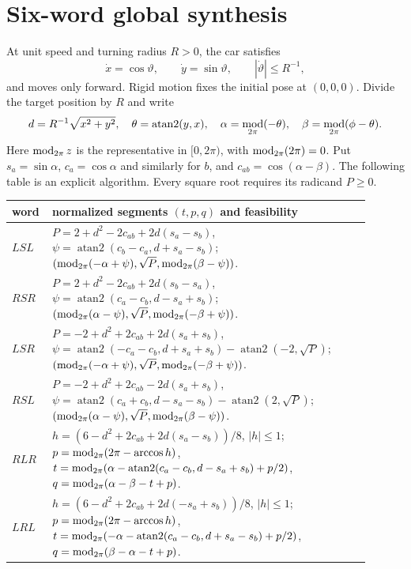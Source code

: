 \documentclass[10pt]{article}
\newcommand{\M}{\mathop{\rm mod}_{2\pi}}
\begin{document}
\section{Six-word global synthesis}
At unit speed and turning radius $R>0$, the car satisfies
\begin{equation}\label{eq:car}
 \dot x=\cos\vartheta,\qquad \dot y=\sin\vartheta,
 \qquad |\dot\vartheta|\le R^{-1},
\end{equation}
and moves only forward.  Rigid motion fixes the initial pose at $(0,0,0)$.
Divide the target position by $R$ and write
\[
 d=R^{-1}\sqrt{x^2+y^2},\quad \theta=\operatorname{atan2}(y,x),
 \quad \alpha=\M(-\theta),\quad \beta=\M(\phi-\theta).
\]
Here $\M z$ is the representative in $[0,2\pi)$, with $\M(2\pi)=0$.
Put $s_a=\sin\alpha$, $c_a=\cos\alpha$ and similarly for $b$, and
$c_{ab}=\cos(\alpha-\beta)$.  The following table is an explicit algorithm.
Every square root requires its radicand $P\ge0$.
\begin{center}\small
\renewcommand{\arraystretch}{1.15}
\begin{tabular}{@{}p{0.07\linewidth}p{0.83\linewidth}@{}}
\toprule
word & normalized segments $(t,p,q)$ and feasibility \\
\midrule
$LSL$ & $P=2+d^2-2c_{ab}+2d(s_a-s_b)$,
$\psi=\operatorname{atan2}(c_b-c_a,d+s_a-s_b)$;
$(\M(-\alpha+\psi),\sqrt P,\M(\beta-\psi))$.\\
$RSR$ & $P=2+d^2-2c_{ab}+2d(s_b-s_a)$,
$\psi=\operatorname{atan2}(c_a-c_b,d-s_a+s_b)$;
$(\M(\alpha-\psi),\sqrt P,\M(-\beta+\psi))$.\\
$LSR$ & $P=-2+d^2+2c_{ab}+2d(s_a+s_b)$,
$\psi=\operatorname{atan2}(-c_a-c_b,d+s_a+s_b)-\operatorname{atan2}(-2,\sqrt P)$;
$(\M(-\alpha+\psi),\sqrt P,\M(-\beta+\psi))$.\\
$RSL$ & $P=-2+d^2+2c_{ab}-2d(s_a+s_b)$,
$\psi=\operatorname{atan2}(c_a+c_b,d-s_a-s_b)-\operatorname{atan2}(2,\sqrt P)$;
$(\M(\alpha-\psi),\sqrt P,\M(\beta-\psi))$.\\
$RLR$ & $h=(6-d^2+2c_{ab}+2d(s_a-s_b))/8$, $|h|\le1$;
$p=\M(2\pi-\arccos h)$,
$t=\M(\alpha-\operatorname{atan2}(c_a-c_b,d-s_a+s_b)+p/2)$,
$q=\M(\alpha-\beta-t+p)$.\\
$LRL$ & $h=(6-d^2+2c_{ab}+2d(-s_a+s_b))/8$, $|h|\le1$;
$p=\M(2\pi-\arccos h)$,
$t=\M(-\alpha-\operatorname{atan2}(c_a-c_b,d+s_a-s_b)+p/2)$,
$q=\M(\beta-\alpha-t+p)$.\\
\bottomrule
\end{tabular}
\end{center}
\end{document}
